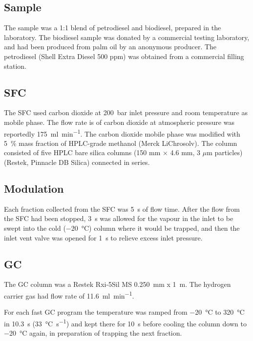 \subsection{Sample}

The sample was a 1:1 blend of petrodiesel and biodiesel, prepared in the
laboratory. The biodiesel sample was donated by a commercial testing laboratory,
and had been produced from palm oil by an anonymous producer. The petrodiesel
(Shell Extra Diesel 500 ppm) was obtained from a commercial filling station.

\subsection{SFC}

The SFC used carbon dioxide at \SI{200}{\bar} inlet pressure and room
temperature as mobile phase. The flow rate is of carbon dioxide at atmospheric
pressure was reportedly \SI{175}{\milli\litre\per\minute}. The carbon dioxide
mobile phase was modified with \SI{5}{\percent} mass fraction of HPLC-grade
methanol (Merck LiChrosolv). The column consisted of five HPLC bare silica
columns (150 mm $\times$ 4.6 mm, 3 $\mu$m particles) (Restek, Pinnacle DB
Silica) connected in series.

\subsection{Modulation}

Each fraction collected from the SFC was \SI{5}{\second} of flow time. After the
flow from the SFC had been stopped, \SI{3}{\second} was allowed for the vapour
in the inlet to be swept into the cold (\SI{-20}{\celsius}) column where it would
be trapped, and then the inlet vent valve was opened for \SI{1}{\second} to
relieve excess inlet pressure.

\subsection{GC}

The GC column was a Restek Rxi-5Sil MS \SI{0.250}{\milli\metre} x
\SI{1}{\metre}. The hydrogen carrier gas had flow rate of
\SI{11.6}{\milli\litre\per\minute}.

For each fast GC program the temperature was ramped from \SI{-20}{\celsius} to
\SI{320}{\celsius} in \SI{10.3}{\second} (\SI{33}{\celsius\per\second}) and kept
there for \SI{10}{\second} before cooling the column down to \SI{-20}{\celsius}
again, in preparation of trapping the next fraction.

